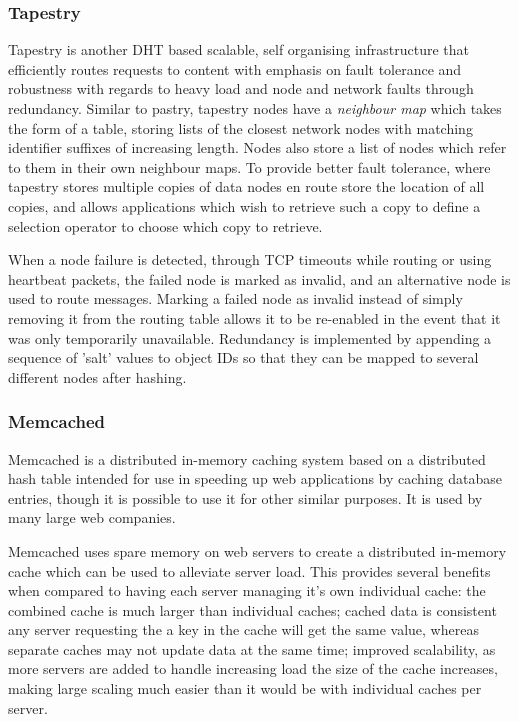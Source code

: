 \documentclass{article}
\begin{document}
\subsubsection{Tapestry}
Tapestry \cite{tapestry} is another DHT based scalable, self organising infrastructure that efficiently routes requests to content with emphasis on fault tolerance and robustness with regards to heavy load and node and network faults through redundancy.
Similar to pastry, tapestry nodes have a \textit{neighbour map} which takes the form of a table, storing lists of the closest network nodes with matching identifier suffixes of increasing length. Nodes also store a list of nodes which refer to them in their own neighbour maps.
To provide better fault tolerance, where tapestry stores multiple copies of data nodes en route store the location of all copies, and allows applications which wish to retrieve such a copy to define a selection operator to choose which copy to retrieve.

When a node failure is detected, through TCP timeouts while routing or using heartbeat packets, the failed node is marked as invalid, and an alternative node is used to route messages. Marking a failed node as invalid instead of simply removing it from the routing table allows it to be re-enabled in the event that it was only temporarily unavailable.
Redundancy is implemented by appending a sequence of 'salt' values to object IDs so that they can be mapped to several different nodes after hashing.

\subsubsection{Memcached} 
Memcached\cite{memcached} is a distributed in-memory caching system based on a distributed hash table intended for use in speeding up web applications by caching database entries, though it is possible to use it for other similar purposes. It is used by many large web companies.

Memcached uses spare memory on web servers to create a distributed in-memory cache which can be used to alleviate server load. This provides several benefits when compared to having each server managing it's own individual cache: the combined cache is much larger than individual caches; cached data is consistent any server requesting the a key in the cache will get the same value, whereas separate caches may not update data at the same time; improved scalability, as more servers are added to handle increasing load the size of the cache increases, making large scaling much easier than it would be with individual caches per server.
\\
\\
\end{document}

